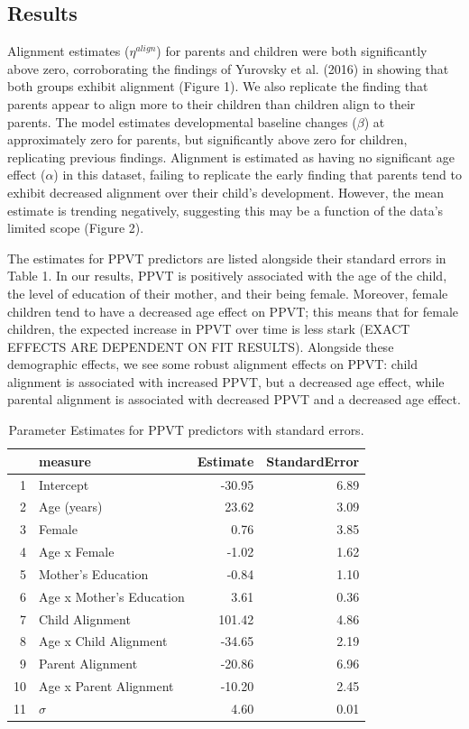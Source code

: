 \documentclass[10pt, letterpaper]{article}
\begin{document}
\hypertarget{results}{%
\subsection{Results}\label{results}}

Alignment estimates (\(\eta^{align}\)) for parents and children were
both significantly above zero, corroborating the findings of Yurovsky et
al. (2016) in showing that both groups exhibit alignment (Figure 1). We
also replicate the finding that parents appear to align more to their
children than children align to their parents. The model estimates
developmental baseline changes (\(\beta\)) at approximately zero for
parents, but significantly above zero for children, replicating previous
findings. Alignment is estimated as having no significant age effect
(\(\alpha\)) in this dataset, failing to replicate the early finding
that parents tend to exhibit decreased alignment over their child's
development. However, the mean estimate is trending negatively,
suggesting this may be a function of the data's limited scope (Figure
2).

The estimates for PPVT predictors are listed alongside their standard
errors in Table 1. In our results, PPVT is positively associated with
the age of the child, the level of education of their mother, and their
being female. Moreover, female children tend to have a decreased age
effect on PPVT; this means that for female children, the expected
increase in PPVT over time is less stark (EXACT EFFECTS ARE DEPENDENT ON
FIT RESULTS). Alongside these demographic effects, we see some robust
alignment effects on PPVT: child alignment is associated with increased
PPVT, but a decreased age effect, while parental alignment is associated
with decreased PPVT and a decreased age effect.

\begin{table}[H]
\centering
\begin{tabular}{rlrr}
  \hline
 & measure & Estimate & StandardError \\ 
  \hline
1 & Intercept & -30.95 & 6.89 \\ 
  2 & Age (years) & 23.62 & 3.09 \\ 
  3 & Female & 0.76 & 3.85 \\ 
  4 & Age x Female & -1.02 & 1.62 \\ 
  5 & Mother's Education & -0.84 & 1.10 \\ 
  6 & Age x Mother's Education & 3.61 & 0.36 \\ 
  7 & Child Alignment & 101.42 & 4.86 \\ 
  8 & Age x Child Alignment & -34.65 & 2.19 \\ 
  9 & Parent Alignment & -20.86 & 6.96 \\ 
  10 & Age x Parent Alignment & -10.20 & 2.45 \\ 
  11 & $\sigma$ & 4.60 & 0.01 \\ 
   \hline
\end{tabular}
\caption{Parameter Estimates for PPVT predictors with standard errors.} 
\end{table}
\end{document}
